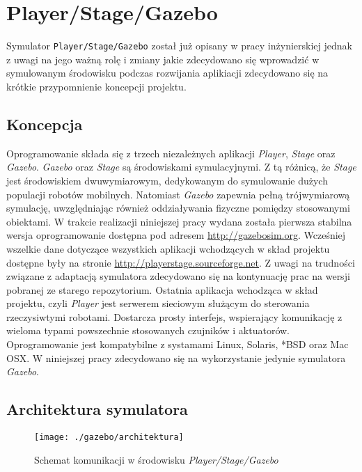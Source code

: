 \chapter[Player/Stage/Gazebo ]{Player/Stage/Gazebo \label{chap:gazebo}}
	Symulator \mbox{\texttt{Player/Stage/Gazebo}} został już opisany w pracy inżynierskiej \cite{inzynierka} jednak z uwagi na jego ważną rolę i zmiany jakie zdecydowano się wprowadzić w symulowanym
	środowisku podczas rozwijania aplikiacji zdecydowano się na krótkie przypomnienie koncepcji projektu.

	\section{Koncepcja}
	Oprogramowanie składa się z trzech niezależnych aplikacji \textit{Player}, \textit{Stage} oraz \textit{Gazebo}.
	\textit{Gazebo} oraz \textit{Stage} są środowiskami symulacyjnymi. Z tą różnicą, że \textit{Stage} jest środowiskiem dwuwymiarowym, dedykowanym do symulowanie dużych populacji robotów
	mobilnych. Natomiast \textit{Gazebo} zapewnia pełną trójwymiarową symulację, uwzględniając również oddziaływania fizyczne pomiędzy stosowanymi obiektami.
	W trakcie realizacji niniejszej pracy wydana została pierwsza stabilna wersja oprogramowanie dostępna pod adresem \url{http://gazebosim.org}.
	Wcześniej wszelkie dane dotyczące wszystkich aplikacji wchodzących w skład projektu dostępne były na stronie \url{http://playerstage.sourceforge.net}. Z uwagi na trudności związane z adaptacją
	symulatora zdecydowano się na kontynuację prac na wersji pobranej ze starego repozytorium.
	Ostatnia aplikacja wchodząca w skład projektu, czyli \textit{Player} jest serwerem sieciowym służącym do sterowania rzeczysiwtymi robotami. Dostarcza prosty interfejs, wspierający komunikację z wieloma 
	typami powszechnie stosowanych czujników i aktuatorów.
	Oprogramowanie jest kompatybilne z systamami Linux, Solaris, *BSD oraz Mac OSX.
	W niniejszej pracy zdecydowano się na wykorzystanie jedynie symulatora \textit{Gazebo}.

	\section{Architektura symulatora}
	\begin{figure}[!b]
	\centering
	\texttt{[image: ./gazebo/architektura]}
	\caption{Schemat komunikacji w środowisku \textit{Player/Stage/Gazebo} \label{fig:arch}}
	\end{figure}
	
